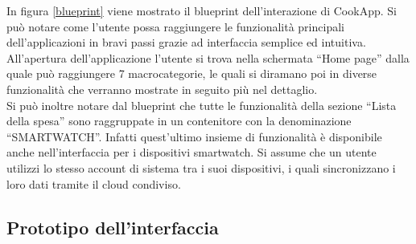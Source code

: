 In figura \ref{blueprint} viene mostrato il blueprint dell'interazione
di CookApp. Si può notare come l'utente possa raggiungere le
funzionalità principali dell'applicazioni in bravi passi grazie ad
interfaccia semplice ed intuitiva. All'apertura dell'applicazione
l'utente si trova nella schermata ``Home page'' dalla quale può raggiungere 7
macrocategorie, le quali si diramano poi in diverse funzionalità che verranno
mostrate in seguito più nel dettaglio.\\
Si può inoltre notare dal blueprint che tutte le funzionalità della
sezione ``Lista della spesa''  sono raggruppate in un contenitore con la
denominazione ``SMARTWATCH''. Infatti quest'ultimo insieme di
funzionalità è disponibile anche nell'interfaccia per i dispositivi
smartwatch. Si assume che un utente utilizzi lo stesso account di
sistema tra i suoi dispositivi, i quali sincronizzano i loro dati
tramite il cloud condiviso.


\begin{landscape}
\label{fig:blueprint}
\begin{figure}[!h]
\centering
{}
\end{figure}
\end{landscape}


\subsection{Prototipo dell'interfaccia}
